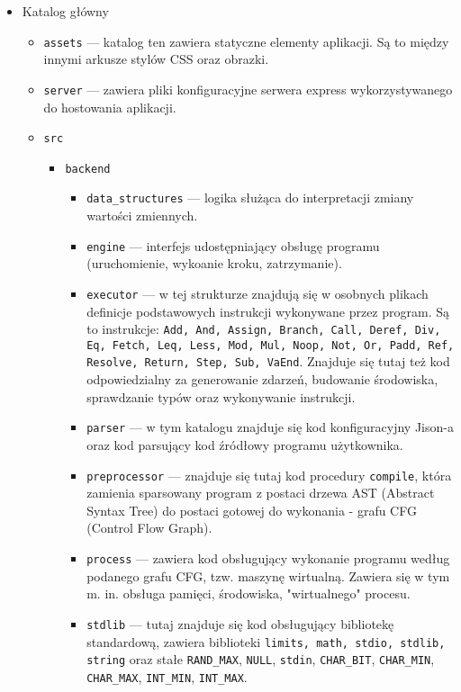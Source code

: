 \documentclass[a4paper,twoside,openright,11pt]{report}
\begin{document}
  \begin {itemize}
    \item Katalog główny
    \begin {itemize}
      \item \texttt{assets} --- katalog ten zawiera statyczne elementy aplikacji. Są to między innymi arkusze stylów CSS oraz obrazki.
      \item \texttt{server} --- zawiera pliki konfiguracyjne serwera express wykorzystywanego do hostowania aplikacji.
      \item \texttt{src}
      \begin {itemize}
        \item \texttt{backend}
	\begin {itemize}
	  \item \texttt{data\_structures} --- logika służąca do interpretacji zmiany wartości zmiennych.
	  \item \texttt{engine} --- interfejs udostępniający obsługę programu (uruchomienie, wykoanie kroku, zatrzymanie).
	  \item \texttt{executor} --- w tej strukturze znajdują się w osobnych plikach definicje podstawowych instrukcji wykonywane przez program. Są to instrukcje: \texttt{Add, And, Assign, Branch, Call, Deref, Div, Eq, Fetch, Leq, Less, Mod, Mul, Noop, Not, Or, Padd, Ref, Resolve, Return, Step, Sub, VaEnd}. Znajduje się tutaj też kod odpowiedzialny za generowanie zdarzeń, budowanie środowiska, sprawdzanie typów oraz wykonywanie instrukcji.
	  \item \texttt{parser} --- w tym katalogu znajduje się kod konfiguracyjny Jison-a oraz kod parsujący kod źródłowy programu użytkownika.
	  \item \texttt{preprocessor} --- znajduje się tutaj kod procedury \texttt{compile}, która zamienia sparsowany program z postaci drzewa AST (Abstract Syntax Tree) do postaci gotowej do wykonania - grafu CFG (Control Flow Graph).
	  \item \texttt{process} --- zawiera kod obsługujący wykonanie programu według podanego grafu CFG, tzw. maszynę wirtualną. Zawiera się w tym m. in. obsługa pamięci, środowiska, "wirtualnego" procesu.
	  \item \texttt{stdlib} --- tutaj znajduje się kod obsługujący bibliotekę standardową, zawiera biblioteki \texttt{limits, math, stdio, stdlib, string} oraz stałe \texttt{RAND\_MAX}, \texttt{NULL}, \texttt{stdin}, \texttt{CHAR\_BIT}, \texttt{CHAR\_MIN}, \texttt{CHAR\_MAX}, \texttt{INT\_MIN}, \texttt{INT\_MAX}.
	\end {itemize} 

\end{itemize}
\end{itemize}
\end{itemize}
\end{document}

